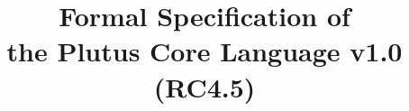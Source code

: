 \documentclass[conference]{IEEEtran}
\begin{document}
%
\title{Formal Specification of\\the Plutus Core Language v1.0 (RC4.5)}











% 








\maketitle
\end{document}
